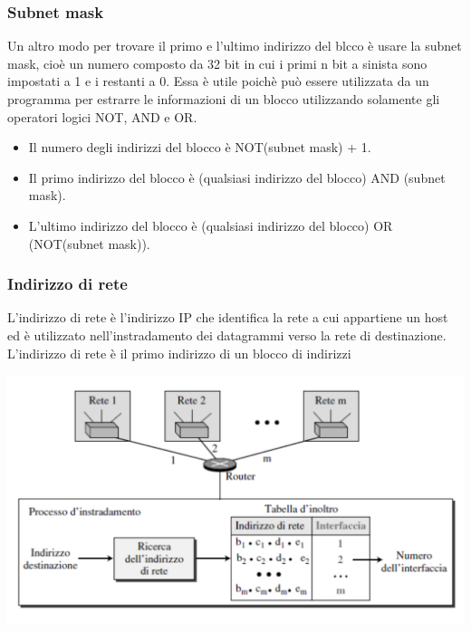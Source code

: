\documentclass[12pt]{report}
\begin{document}
\subsubsection{Subnet mask}
Un altro modo per trovare il primo e l'ultimo indirizzo del blcco è usare la subnet mask, cioè un numero composto da 32 bit in cui i primi n bit a sinista sono impostati a 1 e i restanti a 0. Essa è utile poichè può essere utilizzata da un programma per estrarre le informazioni di un blocco utilizzando solamente gli operatori logici NOT, AND e OR.
\begin{itemize}
	\item Il numero degli indirizzi del blocco è NOT(subnet mask) + 1.
	\item Il primo indirizzo del blocco è (qualsiasi indirizzo del blocco) AND (subnet mask).
	\item L'ultimo indirizzo del blocco è (qualsiasi indirizzo del blocco) OR (NOT(subnet mask)).
\end{itemize}

\subsubsection{Indirizzo di rete}
L'indirizzo di rete è l'indirizzo IP che identifica la rete a cui appartiene un host ed è utilizzato nell'instradamento dei datagrammi verso la rete di destinazione. L'indirizzo di rete è il primo indirizzo di un blocco di indirizzi 
\begin{center}
	\includegraphics[scale=0.35]{assets/network-address.png}
\end{center}
\end{document}
